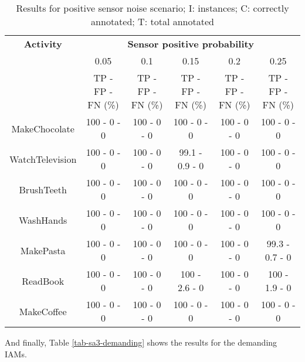 \begin{table}[htbp]\scriptsize
    \begin{center}    
        \begin{tabular}{cccccc}
            \hline            
            \textbf{Activity} & \multicolumn{5}{c}{\textbf{Sensor positive probability}}\\
             & 0.05 & 0.1 & 0.15 & 0.2 & 0.25 \\
             & TP - FP - FN (\%) & TP - FP - FN (\%) & TP - FP - FN (\%) & TP - FP - FN (\%) & TP - FP - FN (\%)\\
            \hline
            MakeChocolate   & 100 - 0 - 0 & 100 - 0 - 0 & 100 - 0 - 0 & 100 - 0 - 0 & 100 - 0 - 0 \\
	    WatchTelevision & 100 - 0 - 0 & 100 - 0 - 0 & 99.1 - 0.9 - 0 & 100 - 0 - 0 & 100 - 0 - 0 \\
	    BrushTeeth      & 100 - 0 - 0 & 100 - 0 - 0 & 100 - 0 - 0 & 100 - 0 - 0 & 100 - 0 - 0 \\
	    WashHands       & 100 - 0 - 0 & 100 - 0 - 0 & 100 - 0 - 0 & 100 - 0 - 0 & 100 - 0 - 0 \\
	    MakePasta       & 100 - 0 - 0 & 100 - 0 - 0 & 100 - 0 - 0 & 100 - 0 - 0 & 99.3 - 0.7 - 0 \\
	    ReadBook        & 100 - 0 - 0 & 100 - 0 - 0 & 100 - 2.6 - 0 & 100 - 0 - 0 & 100 - 1.9 - 0 \\
	    MakeCoffee      & 100 - 0 - 0 & 100 - 0 - 0 & 100 - 0 - 0 & 100 - 0 - 0 & 100 - 0 - 0 \\
            \hline
        \end{tabular}          
        \caption{Results for positive sensor noise scenario; I: instances; C: correctly annotated; T: total annotated}
        \label{tab-sa3-positive}
    \end{center}
\end{table}

And finally, Table \ref{tab-sa3-demanding} shows the results for the demanding IAMs.

